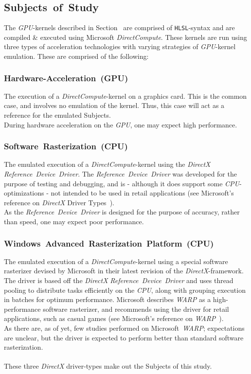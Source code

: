 \subsection{Subjects~of~Study}
\label{sec:contribution:subjectsofstudy}
The \textit{GPU}-kernels described in Section~ are comprised of \texttt{HLSL}-syntax and are compiled \& executed using Microsoft \textit{DirectCompute}.
These kernels are run using three types of acceleration technologies with varying strategies of \textit{GPU}-kernel emulation.
These are comprised of the following:
\subsubsection{Hardware-Acceleration~(GPU)}
The execution of a \textit{DirectCompute}-kernel on a graphics card.
This is the common case, and involves no emulation of the kernel.
Thus, this case will act as a reference for the emulated Subjects.\\
During hardware acceleration on the \textit{GPU}, one may expect high performance.
\subsubsection{Software~Rasterization~(CPU)}
The emulated execution of a \textit{DirectCompute}-kernel using the \textit{DirectX} \textit{Reference~Device~Driver}.
The \textit{Reference~Device~Driver} was developed for the purpose of testing and debugging, and is - although it does support some \textit{CPU}-optimizations - not intended to be used in retail applications (see Microsoft's reference on \textit{DirectX} Driver Types~).\\
As the \textit{Reference~Device~Driver} is designed for the purpose of accuracy, rather than speed, one may expect poor performance.

\subsubsection{Windows~Advanced~Rasterization~Platform~(CPU)}
The emulated execution of a \textit{DirectCompute}-kernel using a special software rasterizer devised by Microsoft in their latest revision of the \textit{DirectX}-framework.
The driver is based off the \textit{DirectX} \textit{Reference~Device~Driver} and uses thread pooling to distribute tasks efficiently on the \textit{CPU}, along with grouping execution in batches for optimum performance.
Microsoft describes \textit{WARP} as a high-performance software rasterizer, and recommends using the driver for retail applications, such as casual games (see Microsoft's reference on \textit{WARP}~).\\
As there are, as of yet, few studies performed on Microsoft~\textit{WARP}; expectations are unclear, but the driver is expected to perform better than standard software rasterization.\\
\\
These three \textit{DirectX} driver-types make out the Subjects of this study.


